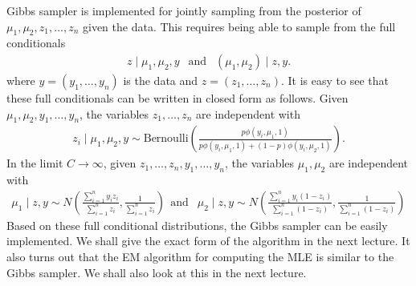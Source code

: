 \documentclass{scrartcl}
\begin{document}
Gibbs sampler is implemented for jointly sampling from the posterior
of $\mu_1, \mu_2, z_1, \dots, z_n$ given the data. This requires being
able to sample from the full conditionals
\begin{align*}
  z \mid \mu_1, \mu_2, y ~~ \text{ and } ~~ (\mu_1, \mu_2) \mid z, y. 
\end{align*}
where $y = (y_1, \dots, y_n)$ is the data and $z = (z_1, \dots,
z_n)$. It is easy to see that these full conditionals can be written
in closed form as follows. Given $\mu_1, \mu_2, y_1, \dots, y_n$, the
variables $z_1, \dots, z_n$ are independent with
\begin{align*}
  z_i \mid \mu_1, \mu_2, y \sim \text{Bernoulli} \left(\frac{p
  \phi(y_i, \mu_1, 1)}{p \phi(y_i, \mu_1, 1) + (1 - p) \phi(y_i,
  \mu_2, 1)}\right). 
\end{align*}
In the limit $C \rightarrow \infty$, given $z_1, \dots, z_n, y_1,
\dots, y_n$, the variables $\mu_1, \mu_2$ are independent with 
\begin{align*}
  \mu_1 \mid z, y \sim N \left(\frac{\sum_{i=1}^n y_i
  z_i}{\sum_{i=1}^n z_i}, \frac{1}{\sum_{i=1}^n z_i} \right) ~~ \text{
  and } ~~   \mu_2 \mid z, y \sim N \left(\frac{\sum_{i=1}^n y_i
  (1 - z_i)}{\sum_{i=1}^n (1 -z_i)}, \frac{1}{\sum_{i=1}^n (1 - z_i)} \right)
\end{align*}
Based on these full conditional distributions, the Gibbs sampler can
be easily implemented. We shall give the exact form of the algorithm
in the next lecture. It also turns out that the EM algorithm for
computing the MLE is similar to the Gibbs sampler. We shall also look
at this in the next lecture. 








  
\end{document}

